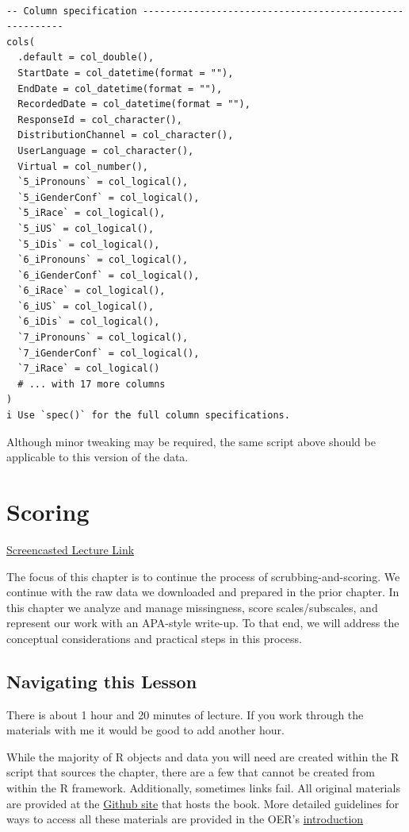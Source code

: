 \documentclass[
  11pt,
]{book}
\begin{document}
\begin{verbatim}

-- Column specification --------------------------------------------------------
cols(
  .default = col_double(),
  StartDate = col_datetime(format = ""),
  EndDate = col_datetime(format = ""),
  RecordedDate = col_datetime(format = ""),
  ResponseId = col_character(),
  DistributionChannel = col_character(),
  UserLanguage = col_character(),
  Virtual = col_number(),
  `5_iPronouns` = col_logical(),
  `5_iGenderConf` = col_logical(),
  `5_iRace` = col_logical(),
  `5_iUS` = col_logical(),
  `5_iDis` = col_logical(),
  `6_iPronouns` = col_logical(),
  `6_iGenderConf` = col_logical(),
  `6_iRace` = col_logical(),
  `6_iUS` = col_logical(),
  `6_iDis` = col_logical(),
  `7_iPronouns` = col_logical(),
  `7_iGenderConf` = col_logical(),
  `7_iRace` = col_logical()
  # ... with 17 more columns
)
i Use `spec()` for the full column specifications.
\end{verbatim}

Although minor tweaking may be required, the same script above should be applicable to this version of the data.

\hypertarget{score}{%
\chapter{Scoring}\label{score}}

\href{https://spu.hosted.panopto.com/Panopto/Pages/Viewer.aspx?pid=18a6be07-5bdc-404d-bc95-acf601830887}{Screencasted Lecture Link}

The focus of this chapter is to continue the process of scrubbing-and-scoring. We continue with the raw data we downloaded and prepared in the prior chapter. In this chapter we analyze and manage missingness, score scales/subscales, and represent our work with an APA-style write-up. To that end, we will address the conceptual considerations and practical steps in this process.

\hypertarget{navigating-this-lesson-1}{%
\section{Navigating this Lesson}\label{navigating-this-lesson-1}}

There is about 1 hour and 20 minutes of lecture. If you work through the materials with me it would be good to add another hour.

While the majority of R objects and data you will need are created within the R script that sources the chapter, there are a few that cannot be created from within the R framework. Additionally, sometimes links fail. All original materials are provided at the \href{https://github.com/lhbikos/ReC_MultivModel}{Github site} that hosts the book. More detailed guidelines for ways to access all these materials are provided in the OER's \protect\hyperlink{ReCintro}{introduction}
\end{document}
